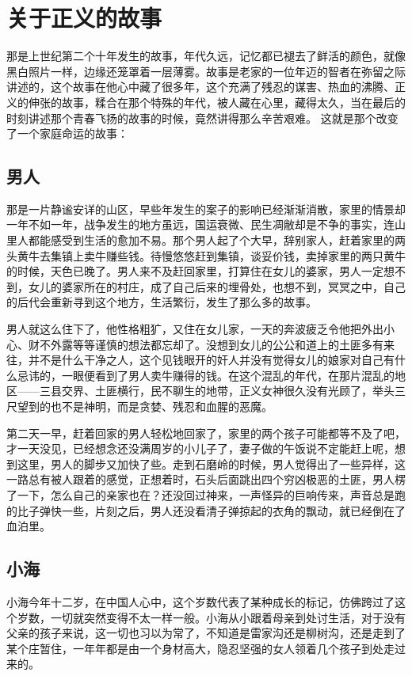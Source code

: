 \chapter{关于正义的故事}

那是上世纪第二个十年发生的故事，年代久远，记忆都已褪去了鲜活的颜色，就像黑白照片一样，边缘还笼罩着一层薄雾。故事是老家的一位年迈的智者在弥留之际讲述的，这个故事在他心中藏了很多年，这个充满了残忍的谋害、热血的沸腾、正义的伸张的故事，糅合在那个特殊的年代，被人藏在心里，藏得太久，当在最后的时刻讲述那个青春飞扬的故事的时候，竟然讲得那么辛苦艰难。 这就是那个改变了一个家庭命运的故事：


\section*{男人}

那是一片静谧安详的山区，早些年发生的案子的影响已经渐渐消散，家里的情景却一年不如一年，战争发生的地方虽远，国运衰微、民生凋敝却是不争的事实，连山里人都能感受到生活的愈加不易。那个男人起了个大早，辞别家人，赶着家里的两头黄牛去集镇上卖牛赚些钱。待慢悠悠赶到集镇，谈妥价钱，卖掉家里的两只黄牛的时候，天色已晚了。男人来不及赶回家里，打算住在女儿的婆家，男人一定想不到，女儿的婆家所在的村庄，成了自己后来的埋骨处，也想不到，冥冥之中，自己的后代会重新寻到这个地方，生活繁衍，发生了那么多的故事。

男人就这么住下了，他性格粗犷，又住在女儿家，一天的奔波疲乏令他把外出小心、财不外露等等谨慎的想法都忘却了。没想到女儿的公公和道上的土匪多有来往，并不是什么干净之人，这个见钱眼开的奸人并没有觉得女儿的娘家对自己有什么忌讳的，一眼便看到了男人卖牛赚得的钱。在这个混乱的年代，在那片混乱的地区——三县交界、土匪横行，民不聊生的地带，正义女神很久没有光顾了，举头三尺望到的也不是神明，而是贪婪、残忍和血腥的恶魔。

第二天一早，赶着回家的男人轻松地回家了，家里的两个孩子可能都等不及了吧，才一天没见，已经想念还没满周岁的小儿子了，妻子做的午饭说不定能赶上呢，想到这里，男人的脚步又加快了些。走到石磨岭的时候，男人觉得出了一些异样，这一路总有被人跟着的感觉，正想着时，石头后面跳出四个穷凶极恶的土匪，男人楞了一下，怎么自己的亲家也在？还没回过神来，一声怪异的巨响传来，声音总是跑的比子弹快一些，片刻之后，男人还没看清子弹掠起的衣角的飘动，就已经倒在了血泊里。


\section*{小海}

小海今年十二岁，在中国人心中，这个岁数代表了某种成长的标记，仿佛跨过了这个岁数，一切就突然变得不太一样一般。小海从小跟着母亲到处讨生活，对于没有父亲的孩子来说，这一切也习以为常了，不知道是雷家沟还是柳树沟，还是走到了某个庄暂住，一年年都是由一个身材高大，隐忍坚强的女人领着几个孩子到处走过来的。


